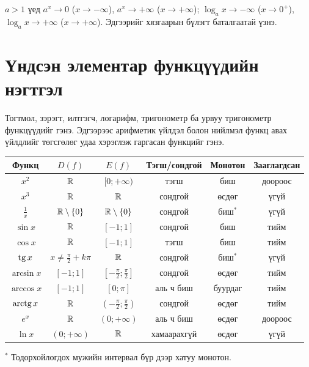 \begin{remark}
$a>1$ үед $a^x\to0$ ($x\to-\infty$), $a^x\to+\infty$ ($x\to+\infty$);
$\log_ax\to-\infty$ ($x\to0^+$), $\log_ax\to+\infty$ ($x\to+\infty$).
Эдгээрийг хязгаарын бүлэгт баталгаатай үзнэ.
\end{remark}

\section{Үндсэн элементар функцүүдийн нэгтгэл}
\begin{definition}
Тогтмол, зэрэгт, илтгэгч, логарифм, тригонометр ба урвуу тригонометр функцүүдийг
 гэнэ. Эдгээрээс арифметик үйлдэл болон нийлмэл функц
авах үйлдлийг төгсгөлөг удаа хэрэглэж гаргасан функцийг  гэнэ.
\end{definition}

\begin{center}
\small
\renewcommand{\arraystretch}{1.4}
\begin{tabular}{c|c|c|c|c|c}
Функц & $D(f)$ & $E(f)$ & Тэгш/сондгой & Монотон & Зааглагдсан\\\hline
$x^2$ & $\mathbb{R}$ & $[0;+\infty)$ & тэгш & биш & доороос\\
$x^3$ & $\mathbb{R}$ & $\mathbb{R}$ & сондгой & өсдөг & үгүй\\
$\frac1x$ & $\mathbb{R}\setminus\{0\}$ & $\mathbb{R}\setminus\{0\}$ & сондгой & биш$^{*}$ & үгүй\\\hline
$\sin x$ & $\mathbb{R}$ & $[-1;1]$ & сондгой & биш & тийм\\
$\cos x$ & $\mathbb{R}$ & $[-1;1]$ & тэгш & биш & тийм\\
$\operatorname{tg} x$ & $x\neq\frac{\pi}{2}+k\pi$ & $\mathbb{R}$ & сондгой & биш$^{*}$ & үгүй\\\hline
$\arcsin x$ & $[-1;1]$ & $\left[-\frac{\pi}{2};\frac{\pi}{2}\right]$ & сондгой & өсдөг & тийм\\
$\arccos x$ & $[-1;1]$ & $[0;\pi]$ & аль ч биш & буурдаг & тийм\\
$\operatorname{arctg} x$ & $\mathbb{R}$ & $\left(-\frac{\pi}{2};\frac{\pi}{2}\right)$ & сондгой & өсдөг & тийм\\\hline
$e^x$ & $\mathbb{R}$ & $(0;+\infty)$ & аль ч биш & өсдөг & доороос\\
$\ln x$ & $(0;+\infty)$ & $\mathbb{R}$ & хамаарахгүй & өсдөг & үгүй
\end{tabular}

\smallskip
{\footnotesize $^{*}$ Тодорхойлогдох мужийн интервал бүр дээр хатуу монотон.}
\end{center}

